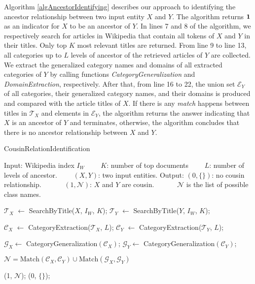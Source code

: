 Algorithm \ref{algAncestorIdentifying} describes our approach to identifying the ancestor relationship between two input entity $X$ and $Y$. The algorithm returns ${\bf 1}$ as an indicator for $X$ to be an ancestor of $Y$. In lines 7 and 8 of the algorithm, we respectively search for articles in Wikipedia that contain all tokens of $X$ and $Y$ in their titles. Only top $K$ most relevant titles are returned. From line 9 to line 13, all categories up to $L$ levels of ancestor of the retrieved articles of $Y$ are collected. We extract the generalized category names and domains of all extracted categories of $Y$ by calling functions {\em CategoryGeneralization} and {\em DomainExtraction}, respectively. After that, from line 16 to 22, the union set ${\mathcal E}_{Y}$ of all categories, their generalized category names, and their domains is produced and compared with the article titles of $X$. If there is any {\em match} happens between titles in ${\mathcal T}_{X}$ and elements in ${\mathcal E}_{Y}$, the algorithm returns the answer indicating that $X$ is an ancestor of $Y$ and terminates, otherwise, the algorithm concludes that there is no ancestor relationship between $X$ and $Y$.

\begin{algorithm} [t]
{\small
\caption{CousinRelationIdentification}
\label{algCousinIdentifying} 
\begin{algorithmic}[1]
\STATE Input: Wikipedia index $I_{W	}$ 
\STATE $\qquad$$K$: number of top documents 
\STATE $\qquad$$L$: number of levels of ancestor. 
\STATE $\qquad$$(X, Y)$: two input entities. 
\STATE Output: $(0,\{\})$: no cousin relationship. 
\STATE $\qquad\quad$$(1,{\mathcal N})$: $X$ and $Y$ are cousin.
\STATE $\quad\qquad$${\mathcal N}$ is the list of possible class names. 

\STATE ${\mathcal T_{X}}$ $\leftarrow$ SearchByTitle($X$, $I_{W}$, $K$);
\STATE ${\mathcal T_{Y}}$ $\leftarrow$ SearchByTitle($Y$, $I_{W}$, $K$);

\STATE ${\mathcal C_{X}}$ $\leftarrow$ CategoryExtraction(${\mathcal T}_{X}$, $L$);
\STATE ${\mathcal C_{Y}}$ $\leftarrow$ CategoryExtraction(${\mathcal T}_{Y}$, $L$);

\STATE ${\mathcal G}_{X} \leftarrow$ CategoryGeneralization$({\mathcal C}_{X})$;
\STATE ${\mathcal G}_{Y} \leftarrow$ CategoryGeneralization$({\mathcal C}_{Y})$;

\STATE ${\mathcal N} = \text{Match}({\mathcal C}_{X}, {\mathcal C}_{Y}) \cup \text{Match}({\mathcal G}_{X}, {\mathcal G}_{Y})$

\RETURN (1, ${\mathcal N}$);
\ELSE
\RETURN (0, $\{\}$);
\ENDIF

\end{algorithmic} 
}
\end{algorithm} 

